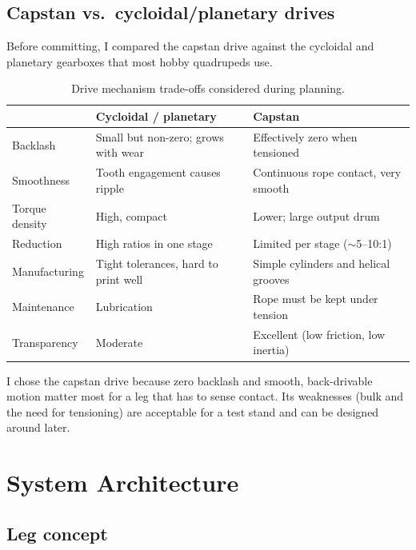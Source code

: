 \documentclass[11pt]{article}
\begin{document}
\subsection{Capstan vs.\ cycloidal/planetary drives}

Before committing, I compared the capstan drive against the cycloidal and
planetary gearboxes that most hobby quadrupeds use.

\begin{table}[H]
\centering
\caption{Drive mechanism trade-offs considered during planning.}
\label{tab:tradeoff}
\begin{tabularx}{\linewidth}{lXX}
\toprule
 & \textbf{Cycloidal / planetary} & \textbf{Capstan} \\
\midrule
Backlash      & Small but non-zero; grows with wear & Effectively zero when tensioned \\
Smoothness    & Tooth engagement causes ripple       & Continuous rope contact, very smooth \\
Torque density& High, compact                         & Lower; large output drum \\
Reduction     & High ratios in one stage              & Limited per stage ($\sim$5--10:1) \\
Manufacturing & Tight tolerances, hard to print well  & Simple cylinders and helical grooves \\
Maintenance   & Lubrication                           & Rope must be kept under tension \\
Transparency  & Moderate                              & Excellent (low friction, low inertia) \\
\bottomrule
\end{tabularx}
\end{table}

I chose the capstan drive because zero backlash and smooth, back-drivable motion
matter most for a leg that has to sense contact. Its weaknesses (bulk and the
need for tensioning) are acceptable for a test stand and can be designed around
later.

\section{System Architecture}

\subsection{Leg concept}
\end{document}

